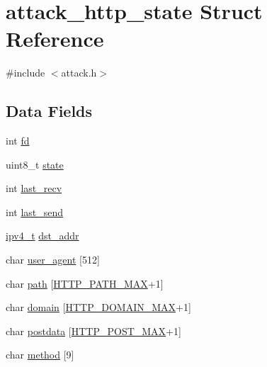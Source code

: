 \hypertarget{structattack__http__state}{}\section{attack\+\_\+http\+\_\+state Struct Reference}
\label{structattack__http__state}


{\ttfamily \#include $<$attack.\+h$>$}

\subsection*{Data Fields}
\begin{DoxyCompactItemize}
\item 
int \hyperlink{structattack__http__state_a6f8059414f0228f0256115e024eeed4b}{fd}
\item 
uint8\+\_\+t \hyperlink{structattack__http__state_a0b57aa10271a66f3dc936bba1d2f3830}{state}
\item 
int \hyperlink{structattack__http__state_ad127e56d0e8e42d9e183c7779015c25a}{last\+\_\+recv}
\item 
int \hyperlink{structattack__http__state_a04740a05fb3dde2a4f4fc74ebd900715}{last\+\_\+send}
\item 
\hyperlink{loader_2src_2headers_2includes_8h_aaadf2e480fd246ff9e932039b223baed}{ipv4\+\_\+t} \hyperlink{structattack__http__state_a2d22095a6311539df835109315b37ffe}{dst\+\_\+addr}
\item 
char \hyperlink{structattack__http__state_ad822f3afc6ca96d5e6968831ba0c9d25}{user\+\_\+agent} \mbox{[}512\mbox{]}
\item 
char \hyperlink{structattack__http__state_a216095570e2e489ac34fde8ed76a7c72}{path} \mbox{[}\hyperlink{attack_8h_a0b7ec3c5170952fe1071a9326cd51264}{H\+T\+T\+P\+\_\+\+P\+A\+T\+H\+\_\+\+M\+AX}+1\mbox{]}
\item 
char \hyperlink{structattack__http__state_a68d155fe5b39db18852b16d2fdaf1edc}{domain} \mbox{[}\hyperlink{attack_8h_af13bc0acf7afcddfcc5098dbe5c343aa}{H\+T\+T\+P\+\_\+\+D\+O\+M\+A\+I\+N\+\_\+\+M\+AX}+1\mbox{]}
\item 
char \hyperlink{structattack__http__state_ae3764fb7c9266b7fcf63ac9213c956d3}{postdata} \mbox{[}\hyperlink{attack_8h_af6a49c502e37f3f5dfc390f758dedc38}{H\+T\+T\+P\+\_\+\+P\+O\+S\+T\+\_\+\+M\+AX}+1\mbox{]}
\item 
char \hyperlink{structattack__http__state_a60da5898c1c16be193f45cd8feacba92}{method} \mbox{[}9\mbox{]}
\item 

\end{DoxyCompactItemize}
